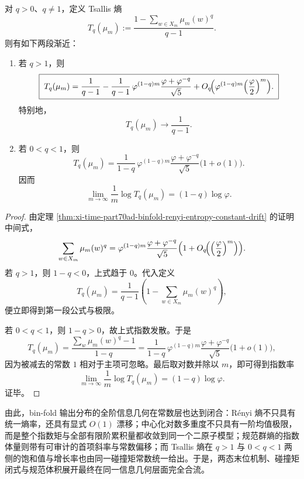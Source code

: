\begin{theorem}\label{thm:xi-time-part70ad-binfold-tsallis-entropy-asymptotics}
对 \(q>0\)、\(q\neq 1\)，定义 Tsallis 熵
\[
T_q(\mu_m):=\frac{1-\sum_{w\in X_m}\mu_m(w)^q}{q-1}.
\]
则有如下两段渐近：
\begin{enumerate}
  \item 若 \(q>1\)，则
  \[
  \boxed{\;
  T_q(\mu_m)
  =
  \frac{1}{q-1}
  -
  \frac{1}{q-1}\,
  \varphi^{(1-q)m}
  \frac{\varphi+\varphi^{-q}}{\sqrt5}
  +
  O_q\!\Bigl(\varphi^{(1-q)m}\Bigl(\frac{\varphi}{2}\Bigr)^m\Bigr).\;}
  \]
  特别地，
  \[
  \boxed{\;
  T_q(\mu_m)\longrightarrow \frac{1}{q-1}.\;}
  \]
  \item 若 \(0<q<1\)，则
  \[
  \boxed{\;
  T_q(\mu_m)
  =
  \frac{1}{1-q}\,
  \varphi^{(1-q)m}
  \frac{\varphi+\varphi^{-q}}{\sqrt5}
  \bigl(1+o(1)\bigr).\;}
  \]
  因而
  \[
  \boxed{\;
  \lim_{m\to\infty}\frac{1}{m}\log T_q(\mu_m)
  =
  (1-q)\log\varphi.\;}
  \]
\end{enumerate}
\end{theorem}
\begin{proof}
由定理 \ref{thm:xi-time-part70ad-binfold-renyi-entropy-constant-drift} 的证明中间式，
\[
\sum_{w\in X_m}\mu_m(w)^q
=
\varphi^{(1-q)m}
\frac{\varphi+\varphi^{-q}}{\sqrt5}
\Bigl(1+O_q\!\Bigl(\Bigl(\frac{\varphi}{2}\Bigr)^m\Bigr)\Bigr).
\]
若 \(q>1\)，则 \(1-q<0\)，上式趋于 \(0\)。代入定义
\[
T_q(\mu_m)
=
\frac{1}{q-1}\left(1-\sum_{w\in X_m}\mu_m(w)^q\right),
\]
便立即得到第一段公式与极限。

若 \(0<q<1\)，则 \(1-q>0\)，故上式指数发散。于是
\[
T_q(\mu_m)
=
\frac{\sum_w\mu_m(w)^q-1}{1-q}
=
\frac{1}{1-q}\,
\varphi^{(1-q)m}
\frac{\varphi+\varphi^{-q}}{\sqrt5}
\bigl(1+o(1)\bigr),
\]
因为被减去的常数 \(1\) 相对于主项可忽略。最后取对数并除以 \(m\)，即可得到指数率
\[
\lim_{m\to\infty}\frac{1}{m}\log T_q(\mu_m)
=(1-q)\log\varphi.
\]
证毕。
\end{proof}

\noindent
由此，bin-fold 输出分布的全阶信息几何在常数层也达到闭合：Rényi 熵不只具有统一熵率，还具有显式 \(O(1)\) 漂移；中心化对数多重度不只具有一阶均值极限，而是整个指数矩与全部有限阶累积量都收敛到同一个二原子模型；规范群熵的指数体量则带有可审计的首项斜率与常数偏移；而 Tsallis 熵在 \(q>1\) 与 \(0<q<1\) 两侧的饱和值与增长率也由同一碰撞矩常数统一给出。于是，两态末位机制、碰撞矩闭式与规范体积展开最终在同一信息几何层面完全合流。

\endinput
